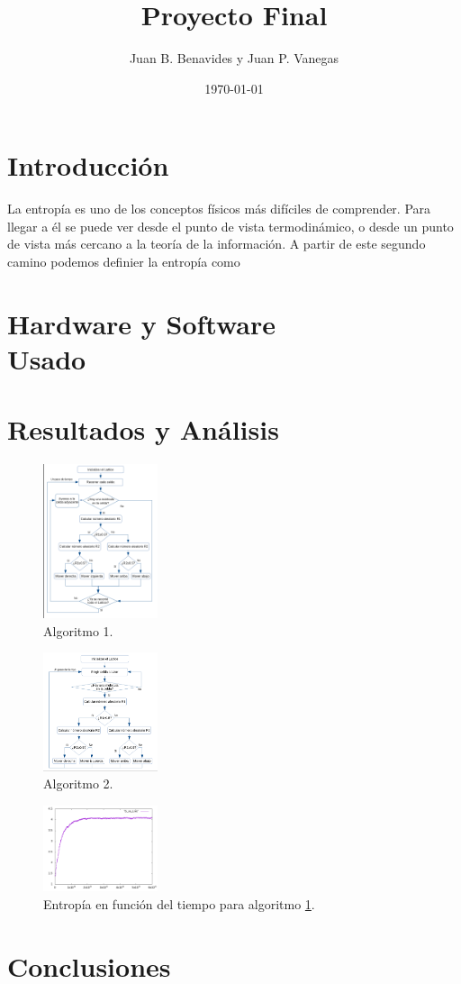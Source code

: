 \documentclass[12pt,twocolumn]{article}
\title{Proyecto Final}
\author{Juan B. Benavides y Juan P. Vanegas }
\date{\today}
\begin{document}
\maketitle

\section{\label{sec: Intro} Introducción}
La entropía es uno de los conceptos físicos más difíciles de comprender. Para llegar a 
él se puede ver desde el punto de vista termodinámico, o desde un punto de vista más 
cercano a la teoría de la información. A partir de este segundo camino podemos definier la 
entropía como 

\section{Hardware y Software \\ Usado}

\section{Resultados y Análisis}
\begin{figure}
    \centering
    \includegraphics[width=0.3\textwidth]{figs/Algoritmo_OOP.png}
    \caption{Algoritmo 1.}
    \label{fig:algoritmo_OOP}
\end{figure}

\begin{figure}
    \centering
    \includegraphics[width=0.3\textwidth]{figs/Algoritmo_Funcional.png}
    \caption{Algoritmo 2.}
    \label{fig:algoritmo_Fun}
\end{figure}

\begin{figure}
    \centering
    \includegraphics[width=0.3\textwidth]{figs/S_vs_t_OOP_all.png}
    \caption{Entropía en función del tiempo para algoritmo \ref{fig:algoritmo_OOP}.}
    \label{fig:s_vs_t}
\end{figure}


\section{Conclusiones}
\end{document}
